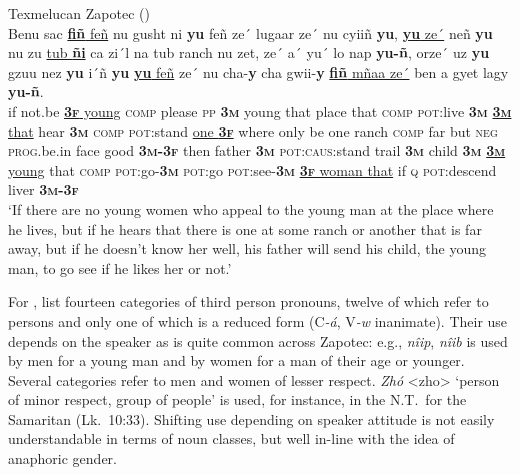 \documentclass[output=collectionpaper]{langsci/langscibook}
\begin{document}
\ea\label{ex:BW:20}
Texmelucan Zapotec (\citealt[32]{Speck1972})\\
\gll Benu	sac	\uline{\textbf{fiñ}	feñ}	nu	gusht	ni	\textbf{yu}	feñ	ze´	lugaar	ze´	nu	cyiiñ	\textbf{yu}, \uline{\textbf{yu}	ze´}	neñ	\textbf{yu}	nu	zu	\uline{tub	\textbf{ñi}}	ca	zi´l	na 	tub	ranch	nu	zet, ze´	a´	yu´	lo	nap	\textbf{yu-ñ},	orze´	uz	\textbf{yu}	gzuu	nez	\textbf{yu}	i´ñ	\textbf{yu} \uline{\textbf{yu}	feñ}	ze´	nu	cha-\textbf{y}	cha	gwii-\textbf{y}	\uline{\textbf{fiñ}	mñaa	ze´} ben	a	gyet	lagy	\textbf{yu-ñ}.\\
if	not.be	\uline{\textbf{\textsc{3f}}	young}	\textsc{comp}	please	\textsc{pp}	\textbf{\textsc{3m}}	young	that	place	that	\textsc{comp}	\textsc{pot}:live	\textbf{\textsc{3m}} \uline{\textbf{\textsc{3m}}	that}	hear	\textbf{\textsc{3m}}	\textsc{comp}	\textsc{pot}:stand	\uline{one	\textbf{\textsc{3f}}}	where 	only 	be 	one	ranch	\textsc{comp}	far but	\textsc{neg}	\textsc{prog}.be.in	face	good	\textbf{\textsc{3m-3f}}	then	father 	\textbf{\textsc{3m}} 	\textsc{pot:caus}:stand	trail	\textbf{\textsc{3m}}	child	\textbf{\textsc{3m}} \uline{\textbf{\textsc{3m}}	young}	that	\textsc{comp}	\textsc{pot}:go-\textbf{\textsc{3m}} 	\textsc{pot}:go	\textsc{pot}:see-\textbf{\textsc{3m}}	\uline{\textbf{\textsc{3f}}	woman 	that} if	\textsc{q}	\textsc{pot}:descend 	liver	\textbf{\textsc{3m-3f}}\\
\glt ‘If there are no young women who appeal to the young man at the place where he lives, but if he hears that there is one at some ranch or another that is far away, but if he doesn’t know her well, his father will send his child, the young man, to go see if he likes her or not.’\\
\z

For , \citet[11]{Hunnn.d.} list fourteen categories of third person pronouns, twelve of which refer to persons and only one of which is a reduced form (C\textit{-á}, V\textit{-w} inanimate). Their use depends on the speaker as is quite common across Zapotec: e.g., \textit{nîip}, \textit{nîib} is used by men for a young man and by women for a man of their age or younger. Several categories refer to men and women of lesser respect. \textit{Zhó} <zho> ‘person of minor respect, group of people’ is used, for instance, in the N.T.\ for the Samaritan (Lk.~10:33). Shifting use depending on speaker attitude is not easily understandable in terms of noun classes, but well in-line with the idea of anaphoric gender.
\end{document}
